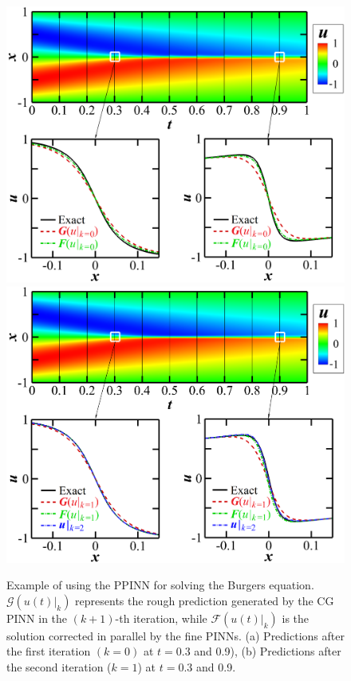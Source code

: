 \documentclass[conference,compsoc]{IEEEtran}
\begin{document}
\begin{figure}
    \centering
    \includegraphics[scale=0.15]{figures/Figure4A.png}
    \includegraphics[scale=0.15]{figures/Figure4B.png}
     \caption{Example of using the PPINN for solving the Burgers equation.$\mathcal{G}(u(t)|_k)$ represents the rough prediction generated by the CG PINN in the $(k+1)$-th iteration, while $\mathcal{F}(u(t)|_k)$ is the solution corrected in parallel by the fine PINNs\cite{raissi2019physics}. (a) Predictions after the first iteration $(k=0)$ at $t = 0.3$ and 0.9), (b) Predictions after the second iteration ($k=1$) at $t = 0.3$ and 0.9.\cite{meng2020ppinn}}
\end{figure}
\end{document}
